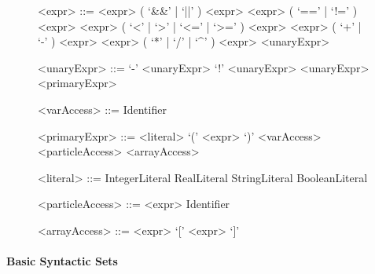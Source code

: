   \begin{figure}
    \centering
    \footnotesize
    \begin{minipage}[t]{.4\textwidth}
      \begin{grammar}
        <expr> ::= <expr> ( `&&' | `||' ) <expr>
        \alt <expr> ( `==' | `!=' ) <expr>
        \alt <expr> ( `<' | `>' | `<=' | `>=' ) <expr>
        \alt <expr> ( `+' | `-' ) <expr>
        \alt <expr> ( `*' | `/' | `^' ) <expr>
        \alt <unaryExpr>

        <unaryExpr> ::= `-' <unaryExpr>
        \alt `!' <unaryExpr>
        \alt \lit{$\sqrt{}$} <unaryExpr>
        \alt <primaryExpr>

        <varAccess> ::= Identifier
      \end{grammar}
    \end{minipage}
    \begin{minipage}[t]{.4\textwidth}
      \begin{grammar}
        <primaryExpr> ::= <literal>
        \alt `(' <expr> `)'
        \alt <varAccess>
        \alt <particleAccess>
        \alt <arrayAccess>

        <literal> ::= IntegerLiteral
        \alt RealLiteral
        \alt StringLiteral
        \alt BooleanLiteral

        <particleAccess> ::= <expr> \lit{$\rightarrow$} Identifier

        <arrayAccess> ::= <expr> `[' <expr> `]'
      \end{grammar}
    \end{minipage}
    \caption{}
    \label{fig:expr-grammar}
  \end{figure}

  \paragraph{Basic Syntactic Sets} %
  \label{par:basic_syntactic_sets}

